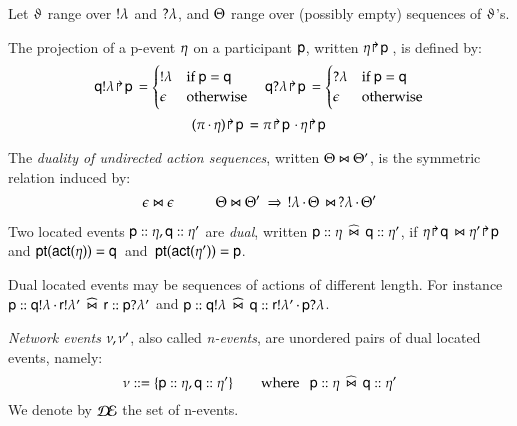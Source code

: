 Let $\vartheta$ range over $!\lambda$  and $?\lambda$, and $\Theta$ range over 
 (possibly empty)  sequences of $\vartheta$'s. 

\begin{definition}\label{pd}
The projection of a  p-event  $\eta$ on a participant
${\sf p}$, written $\eta \! \Rsh \! {\sf p}\,$, is defined by: \\
\[
{\sf q}!\lambda \! \Rsh \! {\sf p}\,=\begin{cases}
!\lambda     & \text{if }{\sf p}={\sf q} \\
   \epsilon   & \text{otherwise}
\end{cases}\quad
{\sf q}?\lambda \! \Rsh \! {\sf p}\,=\begin{cases}
?\lambda     & \text{if }{\sf p}={\sf q} \\
   \epsilon   & \text{otherwise}
\end{cases}
\]
\[
(\pi\,{\cdot}\,\eta) \! \Rsh \! {\sf p}\,=
\pi \! \Rsh \! {\sf p}\,\,{\cdot}\,\eta \! \Rsh \! {\sf p}\, 
\]
\end{definition}


\begin{definition}\label{dualProcEv}
The \emph{duality of undirected action sequences}, written $\Theta\Join \Theta'$, is the
symmetric relation induced by: 
\[ \epsilon\Join \epsilon
\qquad\quad
\Theta\Join \Theta' ~\Rightarrow ~ \,!\lambda\,{\cdot}\,\Theta\,\Join  \,?\lambda\,{\cdot}\,\Theta'
 \]
\end{definition} 


\begin{definition}\label{dualLocEv}
Two located events ${\sf p}:: \eta, {\sf q}:: \eta'$ are \emph{dual}, written  $
  {\sf p}:: \eta\;\,\widehat\Join\;\, {\sf q}:: \eta'$,  if $\eta \! \Rsh \! {\sf q}\,\Join \eta' \! \Rsh \! {\sf p}\,$
  and 
${\sf pt}(\sf act(\eta)) = {\sf q}\,$ and
$\,{\sf pt}(\sf act(\eta')) = {\sf p}$. 
\end{definition}



Dual located events may be sequences of actions of different length. For instance 
${\sf p}:: {\sf q}!\lambda\,{\cdot}\,{\sf r}!\lambda'\;\,\widehat\Join\;\, {\sf r}:: {\sf p}?\lambda'$ and
${\sf p}:: {{\sf q}!\lambda}\;\,\widehat\Join\;\, {\sf q}:: {\sf r}!\lambda'\,{\cdot}\,{\sf p}?\lambda$. 



\begin{definition}
{\em Network events} $\nu, \nu'$, also called
\emph{n-events}, are unordered
pairs of dual %
located events, namely:
\[
\nu ::= \{{\sf p}:: \eta,
    {\sf q}:: \eta'\} \qquad
  \text{where}~~~{\sf p}:: \eta\;\,\widehat\Join\;\, {\sf q}:: \eta'
\]  
We denote by $\mathcal{D\!E}$ the set of n-events.
 \end{definition}


